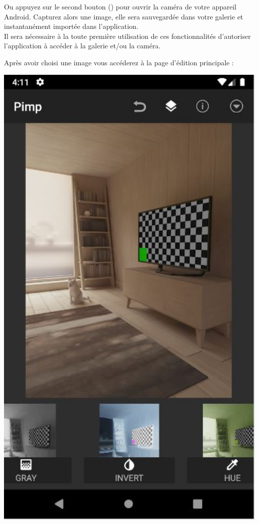\begin{center}
\begin{minipage}{.48\textwidth}
        Ou appuyez sur le second bouton (\faCamera) pour ouvrir la caméra de votre appareil Android. Capturez alors une image, elle sera sauvegardée dans votre galerie et instantanément importée dans l'application.
        \\

        Il sera nécessaire à la toute première utilisation de ces fonctionnalités d'autoriser l'application à accéder à la galerie et/ou la caméra.
    \end{minipage}
\end{center}
\clearpage

Après avoir choisi une image vous accéderez à la page d'édition principale :
\begin{center}
    \begin{minipage}{.48\textwidth}
      \includegraphics[width=1\textwidth]{report_src/app_manual/main_activity_preview.JPG}

\end{minipage}
\end{center}
